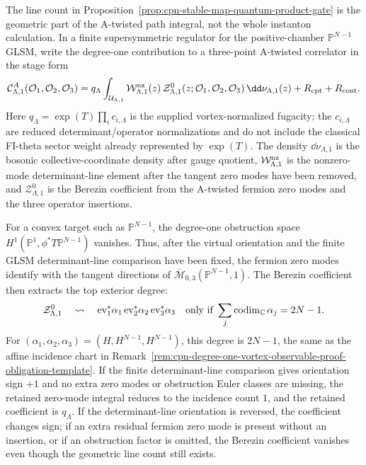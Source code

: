 \begin{remark}
\label{rem:cpn-degree-one-amodel-zero-mode-measure-bridge}
The line count in Proposition~\ref{prop:cpn-stable-map-quantum-product-gate}
is the geometric part of the A-twisted path integral, not the whole
instanton calculation.  In a finite supersymmetric regulator for the
positive-chamber \(\mathbb P^{N-1}\) GLSM, write the degree-one contribution
to a three-point A-twisted correlator in the stage form
\begin{equation}
  \mathcal C_{\Lambda,1}^{A}(\mathcal O_1,\mathcal O_2,\mathcal O_3)
  =
  q_\Lambda
  \int_{\mathcal U_{\Lambda,1}}
    \mathcal W_{\Lambda,1}^{\rm nz}(z)\,
    \mathcal Z_{\Lambda,1}^{0}(z;\mathcal O_1,\mathcal O_2,\mathcal O_3)\,
    \dd\nu_{\Lambda,1}(z)
  +R_{\rm cpt}+R_{\rm cont}.
  \label{eq:cpn-degree-one-amodel-zero-mode-integral}
\end{equation}
Here \(q_\Lambda=\exp(T)\prod_i c_{i,\Lambda}\) is the supplied
vortex-normalized fugacity; the \(c_{i,\Lambda}\) are reduced
determinant/operator normalizations and do not include the classical FI-theta
sector weight already represented by \(\exp(T)\).  The density
\(\dd\nu_{\Lambda,1}\) is the bosonic collective-coordinate density after gauge
quotient, \(\mathcal W_{\Lambda,1}^{\rm nz}\) is the nonzero-mode
determinant-line element after the tangent zero modes have been removed, and
\(\mathcal Z_{\Lambda,1}^{0}\) is the Berezin coefficient from the A-twisted
fermion zero modes and the three operator insertions.

For a convex target such as \(\mathbb P^{N-1}\), the degree-one obstruction
space \(H^1(\mathbb P^1,\phi^\ast T\mathbb P^{N-1})\) vanishes.  Thus, after
the virtual orientation and the finite GLSM determinant-line comparison have
been fixed, the fermion zero modes identify with the tangent directions of
\(\overline{\mathcal M}_{0,3}(\mathbb P^{N-1},1)\).  The Berezin coefficient
then extracts the top exterior degree:
\begin{equation}
  \mathcal Z_{\Lambda,1}^{0}
  \quad\leadsto\quad
  {\rm ev}_1^\ast\alpha_1\,
  {\rm ev}_2^\ast\alpha_2\,
  {\rm ev}_3^\ast\alpha_3
  \quad
  \hbox{only if }
  \sum_j\operatorname{codim}_{\mathbb C}\alpha_j=2N-1 .
  \label{eq:cpn-degree-one-amodel-berezin-degree}
\end{equation}
For
\((\alpha_1,\alpha_2,\alpha_3)=(H,H^{N-1},H^{N-1})\), this degree is
\(2N-1\), the same as the affine incidence chart in
Remark~\ref{rem:cpn-degree-one-vortex-observable-proof-obligation-template}.
If the finite determinant-line comparison gives orientation sign \(+1\) and
no extra zero modes or obstruction Euler classes are missing, the retained
zero-mode integral reduces to the incidence count \(1\), and the retained
coefficient is \(q_\Lambda\).  If the determinant-line orientation is reversed,
the coefficient changes sign; if an extra residual fermion zero mode is
present without an insertion, or if an obstruction factor is omitted, the
Berezin coefficient vanishes even though the geometric line count still
exists.


\end{remark}
